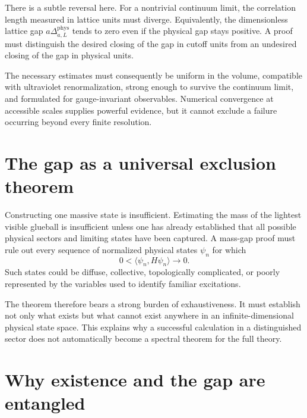 \documentclass[11pt]{article}
\begin{document}
There is a subtle reversal here.  For a nontrivial continuum limit, the
correlation length measured in lattice units must diverge.  Equivalently, the
dimensionless lattice gap $a\Delta^{\mathrm{phys}}_{a,L}$ tends to zero even if
the physical gap stays positive.  A proof must distinguish the desired closing
of the gap in cutoff units from an undesired closing of the gap in physical
units.

The necessary estimates must consequently be uniform in the volume, compatible
with ultraviolet renormalization, strong enough to survive the continuum
limit, and formulated for gauge-invariant observables.  Numerical convergence
at accessible scales supplies powerful evidence, but it cannot exclude a
failure occurring beyond every finite resolution.

\section{The gap as a universal exclusion theorem}

Constructing one massive state is insufficient.  Estimating the mass of the
lightest visible glueball is insufficient unless one has already established
that all possible physical sectors and limiting states have been captured.  A
mass-gap proof must rule out every sequence of normalized physical states
$\psi_n$ for which
\begin{equation}
  0<\langle\psi_n,H\psi_n\rangle\longrightarrow0.
  \label{eq:exclusion}
\end{equation}
Such states could be diffuse, collective, topologically complicated, or poorly
represented by the variables used to identify familiar excitations.

The theorem therefore bears a strong burden of exhaustiveness.  It must
establish not only what exists but what cannot exist anywhere in an
infinite-dimensional physical state space.  This explains why a successful
calculation in a distinguished sector does not automatically become a spectral
theorem for the full theory.

\section{Why existence and the gap are entangled}
\end{document}
